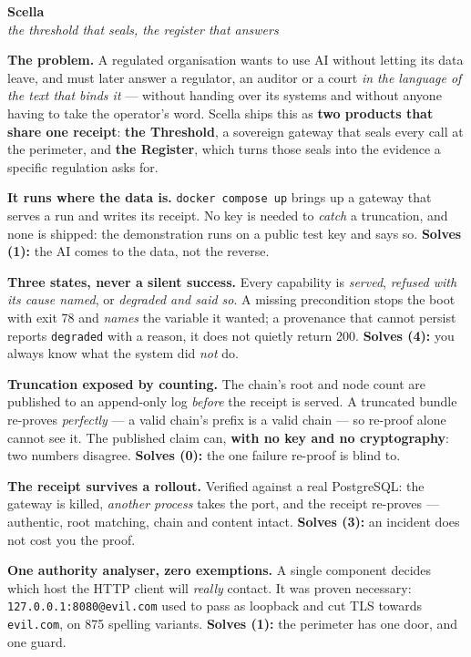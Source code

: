 \documentclass[10pt]{article}
\newcommand{\hd}[1]{\vspace{3.5pt}{\color{efenavy}\large\bfseries #1}\par\vspace{1.5pt}}
\begin{document}
\begin{center}
{\Huge\bfseries\color{efenavy} Scella}\\[3pt]
{\large\color{efegray}\itshape the threshold that seals, the register that answers}
\end{center}
\vspace{2pt}

\textbf{The problem.} A regulated organisation wants to use AI without letting its data leave, and
must later answer a regulator, an auditor or a court \emph{in the language of the text that binds
it} --- without handing over its systems and without anyone having to take the operator's word.
Scella ships this as \textbf{two products that share one receipt}: \textbf{the Threshold}, a
sovereign gateway that seals every call at the perimeter, and \textbf{the Register}, which turns
those seals into the evidence a specific regulation asks for.

\hd{The Threshold (C3): the sealed perimeter --- 20 crates}
\begin{tight}
\item \textbf{It runs where the data is.} \texttt{docker compose up} brings up a gateway that serves
a run and writes its receipt. No key is needed to \emph{catch} a truncation, and none is shipped:
the demonstration runs on a public test key and says so. {\color{efesolve}\textbf{Solves (1):}} the AI comes to the data, not the reverse.
\item \textbf{Three states, never a silent success.} Every capability is \emph{served},
\emph{refused with its cause named}, or \emph{degraded and said so}. A missing precondition stops the
boot with exit 78 and \emph{names} the variable it wanted; a provenance that cannot persist reports
\texttt{degraded} with a reason, it does not quietly return 200. {\color{efesolve}\textbf{Solves (4):}} you always know what the system did \emph{not} do.
\item \textbf{Truncation exposed by counting.} The chain's root and node count are published to an
append-only log \emph{before} the receipt is served. A truncated bundle re-proves \emph{perfectly} ---
a valid chain's prefix is a valid chain --- so re-proof alone cannot see it. The published claim can,
\textbf{with no key and no cryptography}: two numbers disagree. {\color{efesolve}\textbf{Solves (0):}} the one failure re-proof is blind to.
\item \textbf{The receipt survives a rollout.} Verified against a real PostgreSQL: the gateway is
killed, \emph{another process} takes the port, and the receipt re-proves --- authentic, root
matching, chain and content intact. {\color{efesolve}\textbf{Solves (3):}} an incident does not cost you the proof.
\item \textbf{One authority analyser, zero exemptions.} A single component decides which host the
HTTP client will \emph{really} contact. It was proven necessary: \texttt{127.0.0.1:8080@evil.com}
used to pass as loopback and cut TLS towards \texttt{evil.com}, on 875 spelling variants. {\color{efesolve}\textbf{Solves (1):}} the perimeter has one door, and one guard.
\end{tight}
\end{document}
